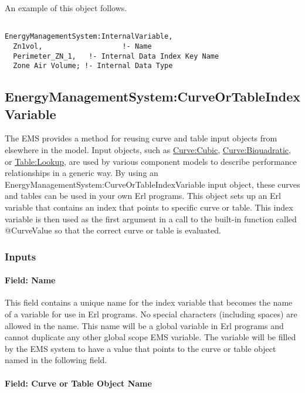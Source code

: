 An example of this object follows.

\begin{lstlisting}

EnergyManagementSystem:InternalVariable,
  Zn1vol,                   !- Name
  Perimeter_ZN_1,   !- Internal Data Index Key Name
  Zone Air Volume; !- Internal Data Type
\end{lstlisting}

\subsection{EnergyManagementSystem:CurveOrTableIndexVariable}\label{energymanagementsystemcurveortableindexvariable}

The EMS provides a method for reusing curve and table input objects from elsewhere in the model. Input objects, such as \hyperref[curvecubic]{Curve:Cubic}, \hyperref[curvebiquadratic]{Curve:Biquadratic}, or \hyperref[tablelookup]{Table:Lookup}, are used by various component models to describe performance relationships in a generic way. By using an EnergyManagementSystem:CurveOrTableIndexVariable input object, these curves and tables can be used in your own Erl programs. This object sets up an Erl variable that contains an index that points to specific curve or table. This index variable is then used as the first argument in a call to the built-in function called @CurveValue so that the correct curve or table is evaluated.

\subsubsection{Inputs}\label{inputs-9-005}

\paragraph{Field: Name}\label{field-name-9-005}

This field contains a unique name for the index variable that becomes the name of a variable for use in Erl programs. No special characters (including spaces) are allowed in the name. This name will be a global variable in Erl programs and cannot duplicate any other global scope EMS variable. The variable will be filled by the EMS system to have a value that points to the curve or table object named in the following field.

\paragraph{Field: Curve or Table Object Name}\label{field-curve-or-table-object-name}

